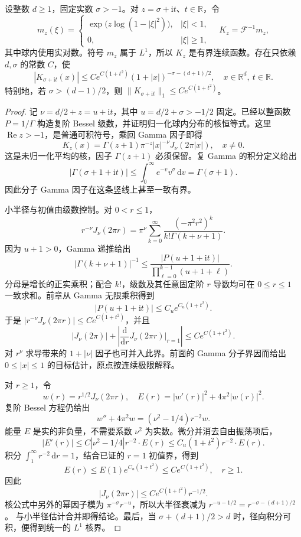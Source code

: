 \begin{lemma}\label{b2:lem:24-complex-kernel}
设整数 \(d\geq1\)，固定实数 \(\sigma>-1\)。对 \(z=\sigma+\mathrm it\)、\(t\in\mathbb R\)，令
\[
 m_z(\xi)=
 \begin{cases}
  \exp\bigl(z\log(1-|\xi|^2)\bigr),&|\xi|<1,\\
  0,&|\xi|\geq1,
 \end{cases}
 \quad K_z=\mathcal F^{-1}m_z,
\]
其中球内使用实对数。符号 \(m_z\) 属于 \(L^1\)，所以 \(K_z\) 是有界连续函数。存在只依赖 \(d,\sigma\) 的常数 \(C\)，使
\[
 |K_{\sigma+\mathrm it}(x)|
 \leq C e^{C(1+t^2)}
 (1+|x|)^{-\sigma-(d+1)/2},
 \quad x\in\mathbb R^d,\ t\in\mathbb R.
\]
特别地，若 \(\sigma>(d-1)/2\)，则
\(\|K_{\sigma+\mathrm it}\|_1\leq C e^{C(1+t^2)}\)。
\end{lemma}
\begin{proof}
记 \(\nu=d/2+z=u+\mathrm it\)，其中 \(u=d/2+\sigma>-1/2\) 固定。已经以整函数 \(P=1/\Gamma\) 构造复阶 Bessel 级数，并证明归一化球内分布的核恒等式。这里 \(\operatorname{Re}z>-1\)，是普通可积符号，乘回 Gamma 因子即得
\[
 K_z(x)=\Gamma(z+1)\pi^{-z}
 |x|^{-\nu}J_\nu(2\pi|x|),\quad x\ne0.
\]
这是未归一化平均的核，因子 \(\Gamma(z+1)\) 必须保留。复 Gamma 的积分定义给出
\[
 |\Gamma(\sigma+1+\mathrm it)|
 \leq\int_0^\infty e^{-v}v^\sigma\,\mathrm dv
 =\Gamma(\sigma+1).
\]
因此分子 Gamma 因子在这条竖线上甚至一致有界。

小半径与初值由级数控制。对 \(0<r\leq1\)，
\[
 r^{-\nu}J_\nu(2\pi r)
 =\pi^\nu\sum_{k=0}^\infty
 \frac{(-\pi^2r^2)^k}{k!\Gamma(k+\nu+1)}.
\]
因为 \(u+1>0\)，Gamma 递推给出
\[
 |\Gamma(k+\nu+1)|^{-1}
 \leq
 \frac{|P(u+1+\mathrm it)|}
 {\prod_{\ell=0}^{k-1}(u+1+\ell)}.
\]
分母是增长的正实乘积；配合 \(k!\)，级数及其任意固定阶 \(r\) 导数均可在 \(0\leq r\leq1\) 一致求和。前章从 Gamma 无限乘积得到
\[
 |P(u+1+\mathrm it)|\leq C_u e^{C_u(1+t^2)}.
\]
于是 \(|r^{-\nu}J_\nu(2\pi r)|\leq C e^{C(1+t^2)}\)，并且
\[
 |J_\nu(2\pi)|+
 \left|\frac{\mathrm d}{\mathrm dr}J_\nu(2\pi r)
 \bigg|_{r=1}\right|
 \leq C e^{C(1+t^2)}.
\]
对 \(r^\nu\) 求导带来的 \(1+|\nu|\) 因子也可并入此界。前面的 Gamma 分子界因而给出 \(0\leq|x|\leq1\) 的目标估计，原点按连续极限解释。

对 \(r\geq1\)，令
\[
 w(r)=r^{1/2}J_\nu(2\pi r),\quad
 E(r)=|w'(r)|^2+4\pi^2|w(r)|^2.
\]
复阶 Bessel 方程仍给出
\[
 w''+4\pi^2w=(\nu^2-1/4)r^{-2}w.
\]
能量 \(E\) 是实的非负量，不需要系数 \(\nu^2\) 为实数。微分并消去自由振荡项后，
\[
 |E'(r)|
 \leq C|\nu^2-1/4|r^{-2}\cdot E(r)
 \leq C_u(1+t^2)r^{-2}\cdot E(r).
\]
积分 \(\int_1^\infty r^{-2}\,\mathrm dr=1\)，结合已证的 \(r=1\) 初值界，得到
\[
 E(r)\leq E(1)e^{C_u(1+t^2)}
 \leq C e^{C(1+t^2)},\quad r\geq1.
\]
因此
\[
 |J_\nu(2\pi r)|
 \leq C e^{C(1+t^2)}r^{-1/2}.
\]
核公式中另外的幂因子模为 \(\pi^{-\sigma}r^{-u}\)，所以大半径衰减为
\(r^{-u-1/2}=r^{-\sigma-(d+1)/2}\)。
与小半径估计合并即得结论。最后，当
\(\sigma+(d+1)/2>d\) 时，径向积分可积，便得到统一的 \(L^1\) 核界。
\end{proof}

